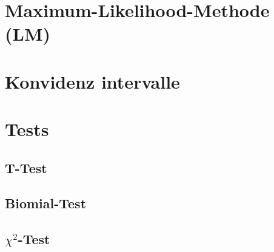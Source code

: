 \documentclass[a4paper, 11pt]{article}
\begin{document}
\section{Maximum-Likelihood-Methode (LM)}
\section{Konvidenz intervalle}
\section{Tests}
\subsection{T-Test}
\subsection{Biomial-Test}
\subsection{$\chi^2$-Test}
\end{document}
